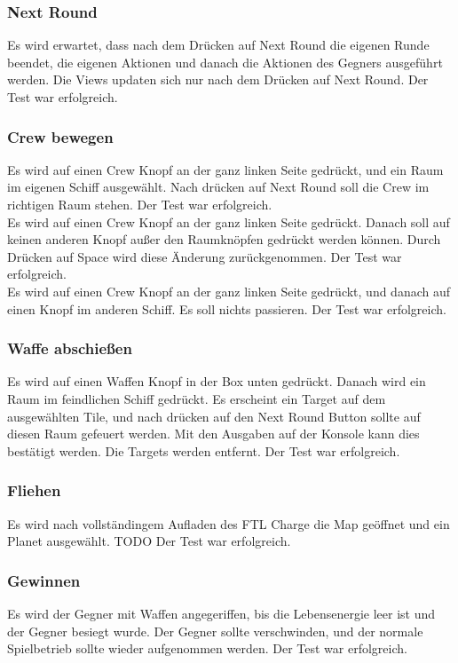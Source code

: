 \documentclass[fontsize=12pt,paper=a4,twoside]{scrartcl}
\begin{document}
\subsubsection{Next Round} 
Es wird erwartet, dass nach dem Drücken auf Next Round die eigenen Runde beendet, die eigenen Aktionen und danach die Aktionen des Gegners ausgeführt werden. Die Views updaten sich nur nach dem Drücken auf Next Round.  Der Test war erfolgreich. \\
\subsubsection{Crew bewegen}
Es wird auf einen Crew Knopf an der ganz linken Seite gedrückt, und ein Raum im eigenen Schiff ausgewählt. Nach drücken auf Next Round soll die Crew im richtigen Raum stehen. Der Test war erfolgreich. \\
Es wird auf einen Crew Knopf an der ganz linken Seite gedrückt. Danach soll auf keinen anderen Knopf außer den Raumknöpfen gedrückt werden können. Durch Drücken auf Space wird diese Änderung zurückgenommen.  Der Test war erfolgreich. \\
Es wird auf einen Crew Knopf an der ganz linken Seite gedrückt, und danach auf einen Knopf im anderen Schiff. Es soll nichts passieren. Der Test war erfolgreich. \\
\subsubsection{Waffe abschießen}
Es wird auf einen Waffen Knopf in der Box unten gedrückt. Danach wird ein Raum im feindlichen Schiff gedrückt. Es erscheint ein Target auf dem ausgewählten Tile, und nach drücken auf den Next Round Button sollte auf diesen Raum gefeuert werden. Mit den Ausgaben auf der Konsole kann dies bestätigt werden. Die Targets werden entfernt.  Der Test war erfolgreich. \\
\subsubsection{Fliehen}
Es wird nach vollständingem Aufladen des FTL Charge die Map geöffnet und ein Planet ausgewählt.  TODO Der Test war erfolgreich. \\
\subsubsection{Gewinnen}
Es wird der Gegner mit Waffen angegeriffen, bis die Lebensenergie leer ist und der Gegner besiegt wurde. Der Gegner sollte verschwinden, und der normale Spielbetrieb sollte wieder aufgenommen werden.  Der Test war erfolgreich. \\
\end{document}

